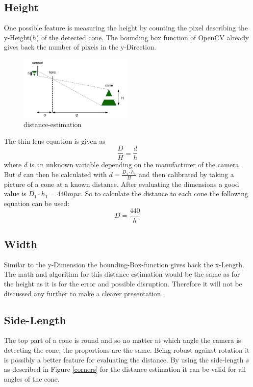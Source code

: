 \documentclass[10pt,a4paper]{article}
\begin{document}
	\subsection{Height} \label{height-estimation}
	One possible feature is measuring the height by counting the pixel describing the y-Height($h$) of the detected cone. The bounding box function of OpenCV already gives back the number of pixels in the y-Direction.
	\begin{figure}[h]
		\centering
		\includegraphics[width=0.5\textwidth]{Abb/distance-estimation.png}
		\caption{distance-estimation}
		\label{distance-estimation}
	\end{figure}
	The thin lens equation is given as
	$$\frac{D}{H}=\frac{d}{h}$$
	where $d$ is an unknown variable depending on the manufacturer of the camera.
	But $d$ can then be calculated with $d=\frac{D_1 \cdot h_1}{H}$ and then calibrated by taking a picture of a cone at a known distance. After evaluating the dimensions a good value is $D_1 \cdot h_1 = 440 \si{mpx}$.
	So to calculate the distance to each cone the following equation can be used:
	$$D = \frac{440}{h}$$
	
	\subsection{Width}
	Similar to the y-Dimension the bounding-Box-function gives back the x-Length. The math and algorithm for this distance estimation would be the same as for the height as it is for the error and possible disruption. Therefore it will not be discussed any further to make a clearer presentation.
	
	\subsection{Side-Length}
	The top part of a cone is round and so no matter at which angle the camera is detecting the cone, the proportions are the same. Being robust against rotation it is possibly a better feature for evaluating the distance.
	By using the side-length $s$ as described in Figure \ref{corners} for the distance estimation it can be valid for all angles of the cone.
	
\end{document}
